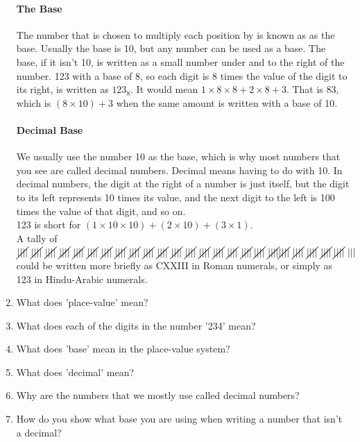 \documentclass[12pt]{article}
\begin{document}
\begin{enumerate}
\paragraph{The Base}
The number that is chosen to multiply each position by is known as as the base. Usually the base is 10, but any number can be used as a base. The base, if it isn't 10, is written as a small number under and to the right of the number. 123 with a base of 8, so each digit is 8 times the value of the digit to its right, is written as $123_8$. It would mean $1 \times 8 \times 8 + 2 \times 8 + 3$. That is 83, which is $(8 \times 10) + 3$ when the same amount is written with a base of 10.

\paragraph{Decimal Base}
We usually use the number 10 as the base, which is why most numbers that you see are called decimal numbers. Decimal means having to do with 10. In decimal numbers, the digit at the right of a number is just itself, but the digit to its left represents 10 times its value, and the next digit to the left is 100 times the value of that digit, and so on.\\

123 is short for $(1 \times 10 \times 10) + (2 \times 10) + (3 \times 1)$.\\

A tally of $\cancel{||||}\ \cancel{||||}\ \cancel{||||}\ \cancel{||||}\ \cancel{||||}\ \cancel{||||}\ \cancel{||||}\ \cancel{||||}\ \cancel{||||}\ \cancel{||||}\ \cancel{||||}\ \cancel{||||}\ \cancel{||||}\ \cancel{||||}\ \cancel{||||}\ \cancel{||||}\ \cancel{||||}\: \cancel{||||}\ \cancel{||||}\ \\ \cancel{||||}\ \cancel{||||}\ \cancel{||||}\ \cancel{||||}\: \cancel{||||}\ |||$ could be written more briefly as CXXIII in Roman numerals, or simply as 123 in Hindu-Arabic numerals.

\item What does 'place-value' mean?
\item What does each of the digits in the number '234' mean?
\item What does 'base' mean in the place-value system?
\item What does 'decimal' mean?
\item Why are the numbers that we mostly use called decimal numbers?
\item How do you show what base you are using when writing a number that isn't a decimal?


\end{enumerate}
\end{document}
